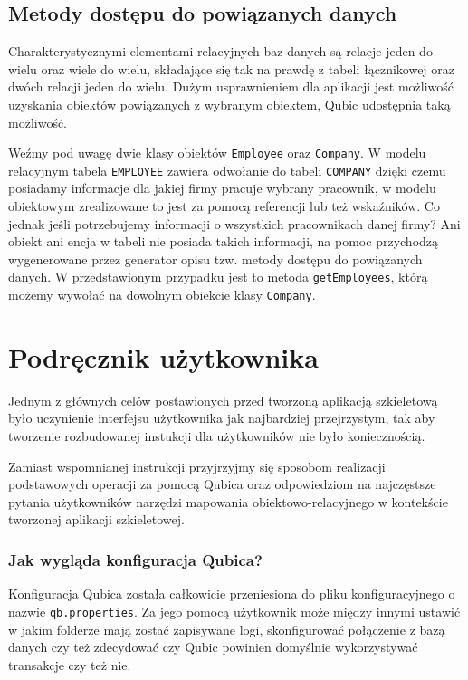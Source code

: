 \documentclass[12pt]{report}
\begin{document}
\subsection{Metody dostępu do powiązanych danych}

Charakterystycznymi elementami relacyjnych baz danych są relacje jeden do wielu oraz wiele do wielu, składające się tak na prawdę z tabeli łącznikowej oraz dwóch relacji
jeden do wielu. Dużym usprawnieniem dla aplikacji jest możliwość uzyskania obiektów powiązanych z wybranym obiektem, Qubic udostępnia taką możliwość.

Weźmy pod uwagę dwie klasy obiektów {\tt Employee} oraz {\tt Company}. W modelu relacyjnym tabela {\tt EMPLOYEE} zawiera odwołanie do tabeli {\tt COMPANY} dzięki
czemu posiadamy informacje dla jakiej firmy pracuje wybrany pracownik, w modelu obiektowym zrealizowane to jest za pomocą referencji lub też wskaźników. Co jednak jeśli
potrzebujemy informacji o wszystkich pracownikach danej firmy? Ani obiekt ani encja w tabeli nie posiada takich informacji, na pomoc przychodzą wygenerowane przez
generator opisu tzw. metody dostępu do powiązanych danych. W przedstawionym przypadku jest to metoda {\tt getEmployees}, którą możemy wywołać na dowolnym obiekcie
klasy {\tt Company}.

\section{Podręcznik użytkownika}

Jednym z głównych celów postawionych przed tworzoną aplikacją szkieletową było uczynienie interfejsu użytkownika jak najbardziej przejrzystym, tak aby tworzenie rozbudowanej
instukcji dla użytkowników nie było koniecznością. 

Zamiast wspomnianej instrukcji przyjrzyjmy się sposobom realizacji podstawowych operacji za pomocą Qubica oraz odpowiedziom na najczęstsze pytania użytkowników narzędzi
mapowania obiektowo-relacyjnego w kontekście tworzonej aplikacji szkieletowej.

\subsubsection{Jak wygląda konfiguracja Qubica?}

Konfiguracja Qubica została całkowicie przeniesiona do pliku konfiguracyjnego o nazwie {\tt qb.properties}. Za jego pomocą użytkownik może między innymi ustawić w jakim 
folderze mają zostać zapisywane logi, skonfigurować połączenie z bazą danych czy też zdecydować czy Qubic powinien domyślnie wykorzystywać transakcje czy też nie.
\end{document}
